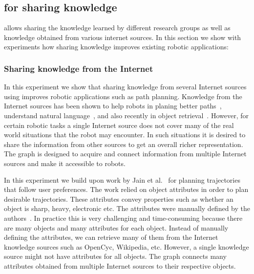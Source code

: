

\subsection{\robobrain{} for sharing knowledge}
\robobrain{} allows sharing the knowledge learned by different research groups as well as knowledge obtained from various internet sources. In this section we show with experiments how sharing knowledge improves existing robotic applications:

\iffalse
\subsubsection{Sharing knowledge from the Internet}
In this experiment we show that sharing knowledge from several Internet sources using \robobrain{} improves robotic applications such as path planning.  Knowledge from the Internet sources has been shown to help robots in planing better paths~\citep{beetzIcra2010}, understand natural language~\citep{coyneCosli,tellex2011understanding}, and also recently in object retrieval~\citep{guadarramaRss2014}. However, for certain robotic tasks a single Internet source does not cover many of the real world situations that the robot may encounter. In such situations it is desired to share the information from other sources to get an overall richer representation.
The \robobrain{} graph is designed to acquire and connect information from multiple Internet sources and make it accessible to robots.

In this experiment we build upon work by Jain et al.~\citep{jainsaxena2013_trajectorypreferences} for planning trajectories that follow user preferences. The work relied on object attributes in order to plan desirable trajectories. These attributes convey properties such as whether an object is sharp, heavy, electronic etc. The attributes were manually defined by the authors~\citep{jainsaxena2013_trajectorypreferences}. In practice this is very challenging and time-consuming because there are many objects and many attributes for each object.
Instead of manually defining the attributes, we can retrieve many of them from the Internet knowledge
sources such as OpenCyc, Wikipedia, etc. However, a single knowledge source might not have
attributes for all objects.
The \robobrain{} graph connects many attributes obtained from multiple Internet sources to their respective objects.


